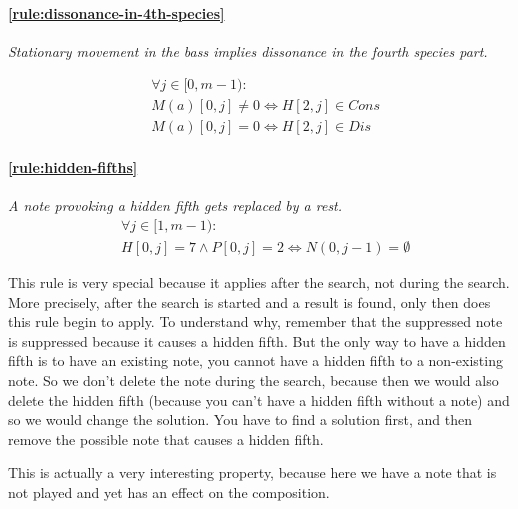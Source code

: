    \paragraph{\hspace{.6cm}\ref{rule:dissonance-in-4th-species}} \textit{Stationary movement in the bass implies dissonance in the fourth species part.}

    \begin{equation}
        \begin{aligned}
        &\forall j \in [0, m-1):\\
        &M(a)[0, j] \neq 0 \iff H[2, j] \in Cons\\
        &M(a)[0, j] = 0 \iff H[2, j] \in Dis
        \end{aligned}
    \end{equation}        


    \paragraph{\hspace{.6cm}\ref{rule:hidden-fifths}} \textit{A note provoking a hidden fifth gets replaced by a rest.}
    \begin{equation}
        \begin{aligned}
            &\forall j \in [1, m-1):\\
            &H[0, j] = 7 \land P[0,j] = 2 \iff N(0, j-1) = \emptyset  
        \end{aligned}
    \end{equation}

    This rule is very special because it applies after the search, not during the search. More precisely, after the search is started and a result is found, only then does this rule begin to apply. To understand why, remember that the suppressed note is suppressed because it causes a hidden fifth. But the only way to have a hidden fifth is to have an existing note, you cannot have a hidden fifth to a non-existing note. So we don't delete the note during the search, because then we would also delete the hidden fifth (because you can't have a hidden fifth without a note) and so we would change the solution. You have to find a solution first, and then remove the possible note that causes a hidden fifth. 

    This is actually a very interesting property, because here we have a note that is not played and yet has an effect on the composition.




